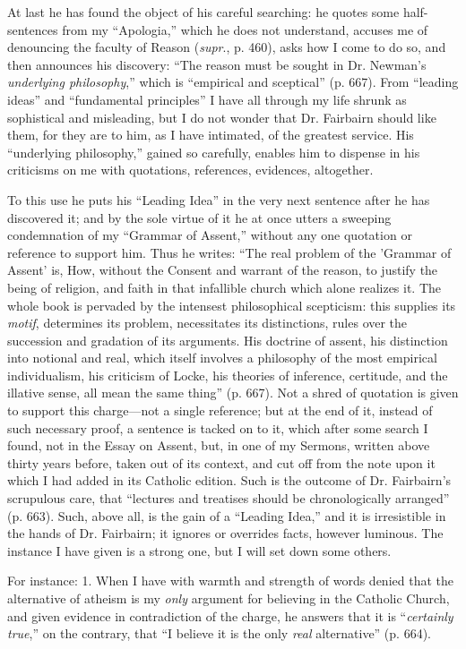 At last he has found the object of his careful searching: he quotes
some half-sentences from my ``Apologia,'' which he does not
understand, accuses me of denouncing the faculty of Reason (\emph{supr}.,
p. 460), asks how I come to do so, and then announces his discovery:
``The reason must be sought in Dr. Newman's \emph{underlying
philosophy},'' which is ``empirical and sceptical'' (p.
667). From ``leading ideas'' and ``fundamental
principles'' I have all through my life shrunk as sophistical and
misleading, but I do not wonder that Dr. Fairbairn should like them,
for they are to him, as I have intimated, of the greatest service. His
``underlying philosophy,'' gained so carefully, enables him to
dispense in his criticisms on me with quotations, references,
evidences, altogether.

To this use he puts his ``Leading Idea'' in the very next
sentence after he has discovered it; and by the sole virtue of it he
at once utters a sweeping condemnation of my ``Grammar of
Assent,'' without any one quotation or reference to support him.
Thus he writes: ``The real problem of the 'Grammar of Assent' is,
How, without the Consent and warrant of the reason, to justify the
being of religion, and faith in that infallible church which alone
realizes it. The whole book is pervaded by the intensest philosophical
scepticism: this supplies its \emph{motif}, determines its problem,
necessitates its distinctions, rules over the succession and gradation
of its arguments. His doctrine of assent, his distinction into
notional and real, which itself involves a philosophy of the most
empirical individualism, his criticism of Locke, his theories of
inference, certitude, and the illative sense, all mean the same
thing'' (p. 667). Not a shred of quotation is given to support
this charge—not a single reference; but at the end of it, instead of
such necessary proof, a sentence is tacked on to it, which after some
search I found, not in the Essay on Assent, but, in one of my Sermons,
written above thirty years before, taken out of its context, and cut
off from the note upon it which I had added in its Catholic
edition. Such is the outcome of Dr. Fairbairn's scrupulous care, that
``lectures and treatises should be chronologically arranged''
(p. 663). Such, above all, is the gain of a ``Leading Idea,''
and it is irresistible in the hands of Dr. Fairbairn; it ignores or
overrides facts, however luminous. The instance I have given is a
strong one, but I will set down some others.

For instance: 1. When I have with warmth and strength of words
denied that the alternative of atheism is my \emph{only} argument for
believing in the Catholic Church, and given evidence in contradiction
of the charge, he answers that it is ``\emph{certainly true},''
on the contrary, that ``I believe it is the only \emph{real}
alternative'' (p. 664).

